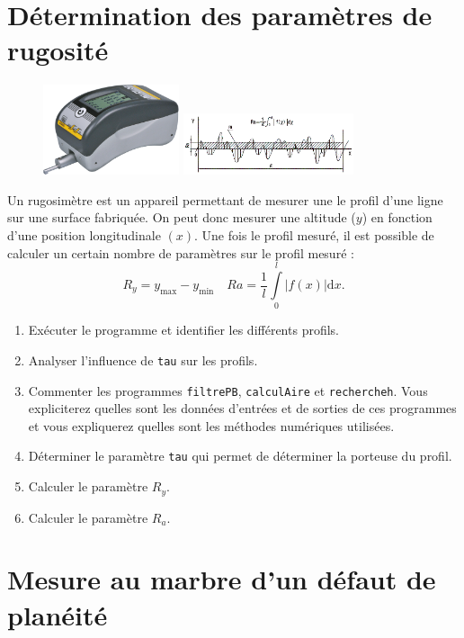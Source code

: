 \documentclass[10pt,fleqn]{article} %
\begin{document}
\newpage
\section{Détermination des paramètres de rugosité}

\begin{figure}
\includegraphics[width=4cm]{images/rugosimetre}
\includegraphics[width=5cm]{images/profil}
\end{figure}
Un rugosimètre est un appareil permettant de mesurer une le profil d'une ligne sur une surface fabriquée. On peut donc mesurer une altitude ($y$) en fonction d'une position longitudinale $(x)$. Une fois le profil mesuré, il est possible de calculer un certain nombre de paramètres sur le profil mesuré : 
$$
R_y = y_{\text{max}} - y_{\text{min}}  \quad  Ra = \dfrac{1}{l}\int\limits_0^l |f(x)| \text{d} x .
$$

\begin{enumerate}
\item Exécuter le programme et identifier les différents profils.
\item Analyser l'influence de \texttt{tau} sur les profils. 
\item Commenter les programmes \texttt{filtrePB}, \texttt{calculAire} et \texttt{rechercheh}. Vous expliciterez quelles sont les données d'entrées et de sorties de ces programmes et vous expliquerez quelles sont les méthodes numériques utilisées.
\item Déterminer le paramètre \texttt{tau} qui permet de déterminer la porteuse du profil. 
\item Calculer le paramètre $R_y$.
\item Calculer le paramètre $R_a$.
\end{enumerate}


\newpage
\section{Mesure au marbre d'un défaut de planéité}
\end{document}
